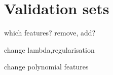 
\section{Validation sets}

which features? remove, add?

change lambda,regularisation

change polynomial features

